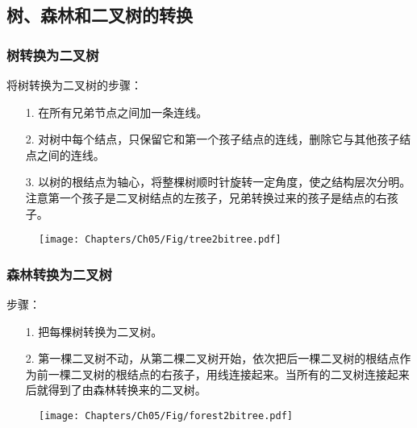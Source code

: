 \subsection{树、森林和二叉树的转换}

\subsubsection{树转换为二叉树}
\begin{frame}\ft{\subsubsecname}
  将树转换为二叉树的步骤：
  \begin{itemize}
  \item[1.]  在所有兄弟节点之间加一条连线。\\[0.1in]
  \item[2.]  对树中每个结点，只保留它和第一个孩子结点的连线，删除它与其他孩子结点之间的连线。\\[0.1in] 
  \item[3.]  以树的根结点为轴心，将整棵树顺时针旋转一定角度，使之结构层次分明。注意第一个孩子是二叉树结点的左孩子，兄弟转换过来的孩子是结点的右孩子。
  \end{itemize}
\end{frame}


\begin{frame}\ft{\subsubsecname}
  \begin{figure}
    \centering
    \texttt{[image: Chapters/Ch05/Fig/tree2bitree.pdf]}
  \end{figure}
\end{frame}

\subsubsection{森林转换为二叉树}
\begin{frame}\ft{\subsubsecname}
  步骤：
  \begin{itemize}
  \item[1.]  把每棵树转换为二叉树。\\[0.1in]
  \item[2.]  第一棵二叉树不动，从第二棵二叉树开始，依次把后一棵二叉树的根结点作为前一棵二叉树的根结点的右孩子，用线连接起来。当所有的二叉树连接起来后就得到了由森林转换来的二叉树。
  \end{itemize}
\end{frame}

\begin{frame}\ft{\subsubsecname}
  \begin{figure}
    \centering
    \texttt{[image: Chapters/Ch05/Fig/forest2bitree.pdf]}
  \end{figure}
\end{frame}


